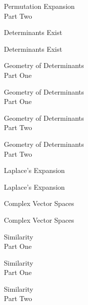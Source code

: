 \documentclass{titlescreen}
\begin{document}
\begin{videotitle}
  Permutation Expansion \\[1ex]
  Part Two
\end{videotitle}
\begin{videoend}
  Determinants Exist
\end{videoend}

\begin{videotitle}
  Determinants Exist
\end{videotitle}
\begin{videoend}
  Geometry of Determinants \\[1ex]
  Part One
\end{videoend}

\begin{videotitle}
  Geometry of Determinants \\[1ex]
  Part One
\end{videotitle}
\begin{videoend}
  Geometry of Determinants \\[1ex]
  Part Two
\end{videoend}

\begin{videotitle}
  Geometry of Determinants \\[1ex]
  Part Two
\end{videotitle}
\begin{videoend}
  Laplace's Expansion
\end{videoend}


\begin{videotitle}
  Laplace's Expansion
\end{videotitle}
\begin{videoend}
  Complex Vector Spaces
\end{videoend}




\begin{videotitle}
  Complex Vector Spaces  
\end{videotitle}
\begin{videoend}
  Similarity \\[1ex]
  Part One
\end{videoend}

\begin{videotitle}
  Similarity \\[1ex]
  Part One
\end{videotitle}
\begin{videoend}
  Similarity \\[1ex]
  Part Two
\end{videoend}
\end{document}
